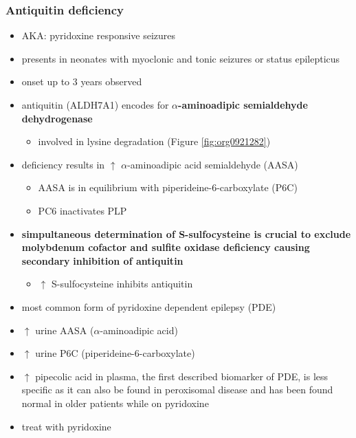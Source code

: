 \documentclass{scrartcl}
\begin{document}
\subsubsection{Antiquitin deficiency}
\label{sec:org484103b}
\begin{itemize}
\item AKA: pyridoxine responsive seizures
\item presents in neonates with myoclonic and tonic seizures or
status epilepticus
\item onset up to 3 years observed
\item antiquitin (ALDH7A1) encodes for \textbf{\(\alpha\)-aminoadipic semialdehyde dehydrogenase}
\begin{itemize}
\item involved in lysine degradation (Figure \ref{fig:org0921282})
\end{itemize}
\end{itemize}
\begin{itemize}
\item deficiency results in \(\uparrow\) \(\alpha\)-aminoadipic acid semialdehyde (AASA)
\begin{itemize}
\item AASA is in equilibrium with piperideine-6-carboxylate (P6C)
\item PC6 inactivates PLP
\end{itemize}
\end{itemize}
\begin{itemize}
\item \textbf{simpultaneous determination of S-sulfocysteine is crucial to exclude}
\textbf{molybdenum cofactor and sulfite oxidase deficiency causing secondary}
\textbf{inhibition of antiquitin}
\begin{itemize}
\item \(\uparrow\) S-sulfocysteine inhibits antiquitin
\end{itemize}
\item most common form of pyridoxine dependent epilepsy (PDE)
\item \(\uparrow\) urine AASA (\(\alpha\)-aminoadipic acid)
\item \(\uparrow\) urine P6C (piperideine-6-carboxylate)
\item \(\uparrow\) pipecolic acid in plasma, the first described biomarker of PDE, is
less specific as it can also be found in peroxisomal disease and has
been found normal in older patients while on pyridoxine
\item treat with pyridoxine
\end{itemize}
\end{document}
